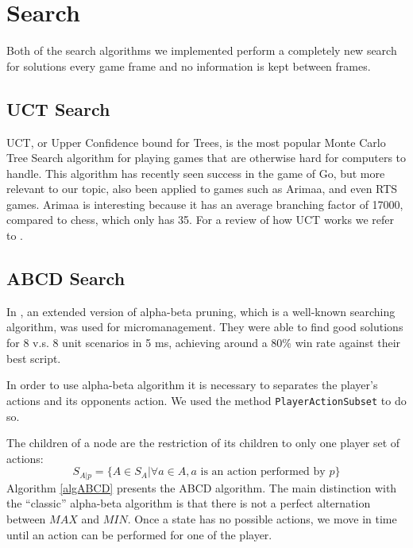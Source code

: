 \section{Search}
Both of the search algorithms we implemented perform a completely new search for solutions every game frame and no information is kept between frames.

\subsection{UCT Search}
UCT, or Upper Confidence bound for Trees, is the most popular Monte Carlo Tree Search algorithm for playing games that are otherwise hard for computers to handle. \cite{mcts}
This algorithm has recently seen success in the game of Go, but more relevant to our topic, also been applied to games such as Arimaa, and even RTS games.
Arimaa is interesting because it has an average branching factor of 17000, compared to chess, which only has 35. \cite{arimaawiki}
For a review of how UCT works we refer to \cite{mcts}.

\subsection{ABCD Search}
In \cite{abcd}, an extended version of alpha-beta pruning, which is a well-known searching algorithm, was used for micromanagement. 
They were able to find good solutions for 8 v.s. 8 unit scenarios in 5 ms, achieving around a 80\% win rate against their best script.

In order to use alpha-beta algorithm it is necessary to separates the player's actions and its opponents action. We used the method \texttt{PlayerActionSubset} to do so. 

The children of a node are the restriction of its children to only one player set of actions:
$$
S_{A|p} = \{A \in S_A | \forall a \in A, a \text{ is an action performed by $p$}\}
$$
Algorithm \ref{algABCD} presents the ABCD algorithm.
The main distinction with the ``classic'' alpha-beta algorithm is that there is not a perfect alternation between $MAX$ and $MIN$. Once a state has no possible actions, we move in time until an action can be performed for one of the player. 

